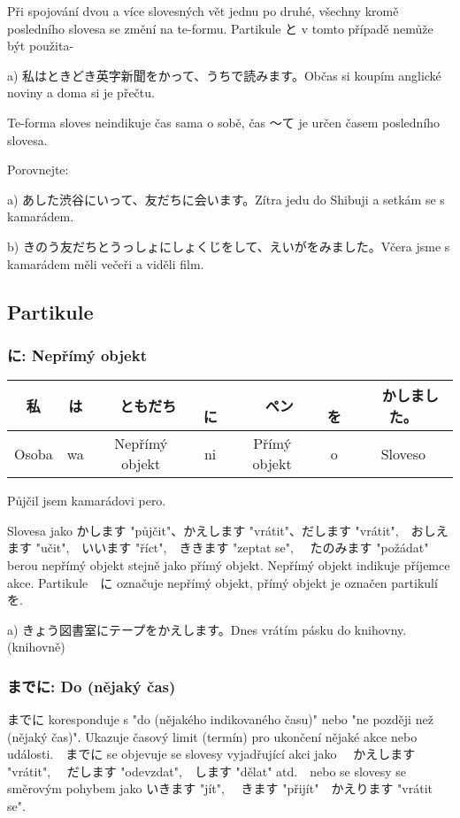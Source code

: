 Při spojování dvou a více slovesných vět jednu po druhé, všechny kromě posledního slovesa se změní na te-formu. Partikule と v tomto případě nemůže být použita-

a) 私はときどき英字新聞をかって、うちで読みます。Občas si koupím anglické noviny a doma si je přečtu.

Te-forma sloves neindikuje čas sama o sobě, čas 〜て je určen časem posledního slovesa.

Porovnejte:

a) あした渋谷にいって、友だちに会います。Zítra jedu do Shibuji a setkám se s kamarádem.

b) きのう友だちとうっしょにしょくじをして、えいがをみました。Včera jsme s kamarádem měli večeři a viděli film.

\subsection{Partikule}
\subsubsection{に: Nepřímý objekt}
\begin{center}
\begin{tabular}{ccccccc}
\hline
私　&は&　ともだち&　に&　ペン&　を&　かしました。\\
\hline
Osoba&wa&Nepřímý objekt&ni&Přímý objekt&o&Sloveso\\
\hline
\end{tabular}
\end{center}
Půjčil jsem kamarádovi pero.

Slovesa jako かします "půjčit"、かえします "vrátit"、だします "vrátit",　おしえます "učit",　いいます "říct",　ききます "zeptat se", 　たのみます "požádat" berou nepřímý objekt stejně jako přímý objekt. Nepřímý objekt indikuje příjemce akce. Partikule　に označuje nepřímý objekt, přímý objekt je označen partikulí　を.

a) きょう図書室にテープをかえします。Dnes vrátím pásku do knihovny. (knihovně)

\subsubsection{までに: Do (nějaký čas)}

までに koresponduje s "do (nějakého indikovaného času)" nebo "ne později než (nějaký čas)". Ukazuje časový limit (termín) pro ukončení nějaké akce nebo události.　までに se objevuje se slovesy vyjadřující akci jako 　かえします "vrátit", 　だします "odevzdat",　します "dělat" atd.　nebo se slovesy se směrovým pohybem jako いきます "jít", 　きます "přijít"　かえります "vrátit se". 


